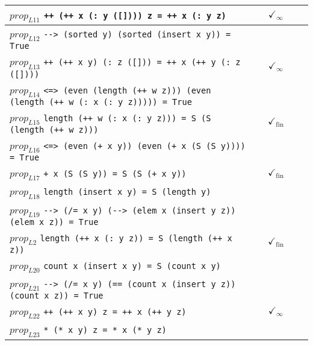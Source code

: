 \documentclass{article}
\begin{document}
\begin{longtable}{p{10cm} || c | c | c | c | }
\hline
$prop_{L11}$ \newline \verb`++ (++ x (: y ([]))) z = ++ x (: y z)` &  & $\checkmark_{\infty}$ &  &  \\
\hline
$prop_{L12}$ \newline \verb`--> (sorted y) (sorted (insert x y)) = True` &  &  &  &  \\
\hline
$prop_{L13}$ \newline \verb`++ (++ x y) (: z ([])) = ++ x (++ y (: z ([])))` &  & $\checkmark_{\infty}$ &  &  \\
\hline
$prop_{L14}$ \newline \verb`<=> (even (length (++ w z))) (even (length (++ w (: x (: y z))))) = True` &  &  &  &  \\
\hline
$prop_{L15}$ \newline \verb`length (++ w (: x (: y z))) = S (S (length (++ w z)))` &  & $\checkmark_{\mathrm{fin}}$ &  &  \\
\hline
$prop_{L16}$ \newline \verb`<=> (even (+ x y)) (even (+ x (S (S y)))) = True` &  &  &  &  \\
\hline
$prop_{L17}$ \newline \verb`+ x (S (S y)) = S (S (+ x y))` &  & $\checkmark_{\mathrm{fin}}$ &  &  \\
\hline
$prop_{L18}$ \newline \verb`length (insert x y) = S (length y)` &  &  &  &  \\
\hline
$prop_{L19}$ \newline \verb`--> (/= x y) (--> (elem x (insert y z)) (elem x z)) = True` &  &  &  &  \\
\hline
$prop_{L2}$ \newline \verb`length (++ x (: y z)) = S (length (++ x z))` &  & $\checkmark_{\mathrm{fin}}$ &  &  \\
\hline
$prop_{L20}$ \newline \verb`count x (insert x y) = S (count x y)` &  &  &  &  \\
\hline
$prop_{L21}$ \newline \verb`--> (/= x y) (== (count x (insert y z)) (count x z)) = True` &  &  &  &  \\
\hline
$prop_{L22}$ \newline \verb`++ (++ x y) z = ++ x (++ y z)` &  & $\checkmark_{\infty}$ &  &  \\
\hline
$prop_{L23}$ \newline \verb`* (* x y) z = * x (* y z)` &  &  &  &  \\

\end{longtable}
\end{document}
